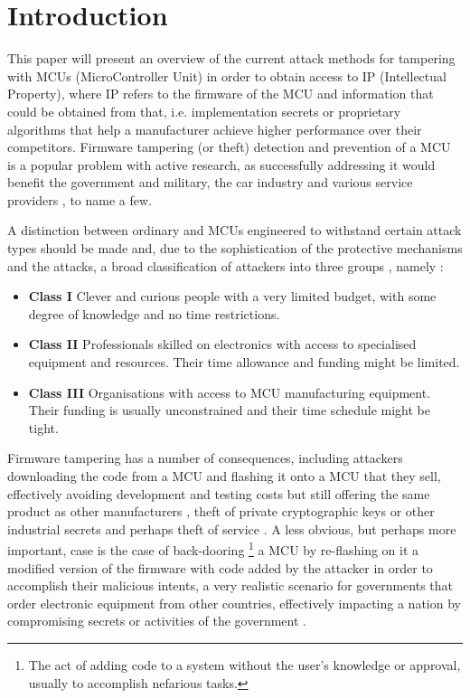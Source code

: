 \section{Introduction}
	This paper will present an overview of the current attack methods for tampering with MCUs (MicroController Unit) in order to obtain access to IP (Intellectual Property), where IP refers to the firmware of the MCU and information that could be obtained from that, i.e. implementation secrets or proprietary algorithms that help a manufacturer achieve higher performance over their competitors. Firmware tampering (or theft) detection and prevention of a MCU is a popular problem with active research, as successfully addressing it would benefit the government and military, the car industry and various service providers \citep{sergei:thesis}, to name a few.
	
	A distinction between ordinary and MCUs engineered to withstand certain attack types should be made\citep{sergei:thesis} and, due to the sophistication of the protective mechanisms and the attacks, a broad classification of attackers into three groups \cite{anderson:cautionary_note}, namely :
		\begin{itemize}
			\item \textbf{Class I} Clever and curious people with a very limited budget, with some degree of knowledge and no time restrictions.\\
			\item \textbf{Class II} Professionals skilled on electronics with access to specialised equipment and resources. Their time allowance and funding might be limited.\\
			\item \textbf{Class III} Organisations with access to MCU manufacturing equipment. Their funding is usually unconstrained and their time schedule might be tight.
		\end{itemize}
	
	Firmware tampering has a number of consequences, including attackers downloading the code from a MCU and flashing it onto a MCU that they sell, effectively avoiding development and testing costs but still offering the same product as other manufacturers \cite{tech:aes_bls}, theft of private cryptographic keys or other industrial secrets and perhaps theft of service \citep{sergei:thesis}. A less obvious, but perhaps more important, case is the case of back-dooring \footnote{The act of adding code to a system without the user's knowledge or approval, usually to accomplish nefarious tasks.} a MCU by re-flashing on it a modified version of the firmware with code added by the attacker in order to accomplish their malicious intents, a very realistic scenario for governments that order electronic equipment from other countries, effectively impacting a nation by compromising secrets or activities of the government .

